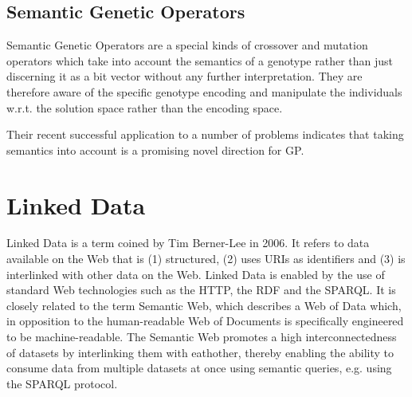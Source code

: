 \newpage
\subsection{Semantic Genetic Operators}
\label{ssec:sgo}

Semantic Genetic Operators are a special kinds of crossover and mutation operators which take into account the semantics of a genotype rather than just discerning it as a bit vector without any further interpretation.
They are therefore aware of the specific genotype encoding and manipulate the individuals w.r.t. the solution space rather than the encoding space.

Their recent successful application to a number of problems\cite{chen:2017a,forstenlechner:2017a,peng:ia2019a,suarez:rcs2015a} indicates that taking semantics into account is a promising novel direction for \ac{GP}.

\section{Linked Data}
\label{sec:ld}

Linked Data\cite{berners-lee:2006a, bizer:2008a, bizer:ijsis2009a} is a term coined by Tim Berner-Lee\cite{berners-lee:2006a} in 2006.
It refers to data available on the Web that is (1) structured, (2) uses \acp{URI} as identifiers and (3) is interlinked with other data on the Web.
Linked Data is enabled by the use of standard Web technologies such as the \ac{HTTP}, the \ac{RDF} and the \ac{SPARQL}.
It is closely related to the term Semantic Web, which describes a Web of Data which, in opposition to the human-readable Web of Documents is specifically engineered to be machine-readable.
The Semantic Web promotes a high interconnectedness of datasets by interlinking them with eathother, thereby enabling the ability to consume data from multiple datasets at once using semantic queries, e.g. using the \ac{SPARQL} protocol.

